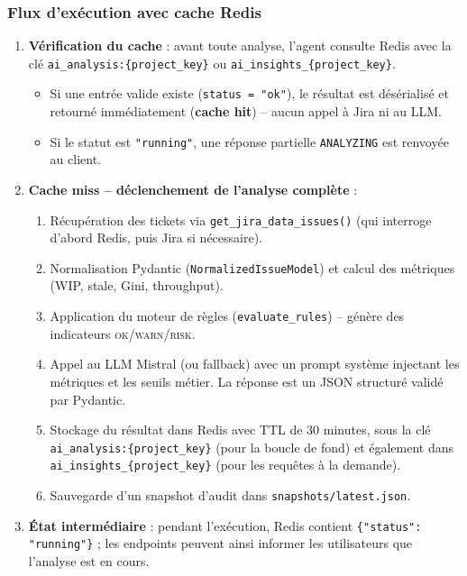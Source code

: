 \subsubsection*{Flux d’exécution avec cache Redis}

\begin{enumerate}
    \item \textbf{Vérification du cache} : avant toute analyse, l’agent consulte Redis avec la clé \texttt{ai\_analysis:\{project\_key\}} ou \texttt{ai\_insights\_\{project\_key\}}.
    \begin{itemize}
        \item Si une entrée valide existe (\texttt{status = "ok"}), le résultat est désérialisé et retourné immédiatement (\textbf{cache hit}) – aucun appel à Jira ni au LLM.
        \item Si le statut est \texttt{"running"}, une réponse partielle \texttt{ANALYZING} est renvoyée au client.
    \end{itemize}
    \item \textbf{Cache miss – déclenchement de l’analyse complète} :
    \begin{enumerate}
        \item Récupération des tickets via \texttt{get\_jira\_data\_issues()} (qui interroge d’abord Redis, puis Jira si nécessaire).
        \item Normalisation Pydantic (\texttt{NormalizedIssueModel}) et calcul des métriques (WIP, stale, Gini, throughput).
        \item Application du moteur de règles (\texttt{evaluate\_rules}) – génère des indicateurs \textsc{ok}/\textsc{warn}/\textsc{risk}.
        \item Appel au LLM Mistral (ou fallback) avec un prompt système injectant les métriques et les seuils métier. La réponse est un JSON structuré validé par Pydantic.
        \item Stockage du résultat dans Redis avec TTL de 30 minutes, sous la clé \texttt{ai\_analysis:\{project\_key\}} (pour la boucle de fond) et également dans \texttt{ai\_insights\_\{project\_key\}} (pour les requêtes à la demande).
        \item Sauvegarde d’un snapshot d’audit dans \texttt{snapshots/latest.json}.
    \end{enumerate}
    \item \textbf{État intermédiaire} : pendant l’exécution, Redis contient \texttt{\{"status": "running"\}} ; les endpoints peuvent ainsi informer les utilisateurs que l’analyse est en cours.
\end{enumerate}

